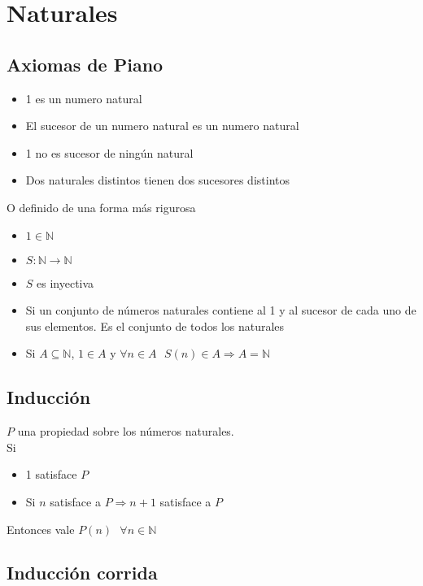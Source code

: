 \documentclass[a4paper,10pt]{article}
\begin{document}
\section{Naturales}


\subsection{Axiomas de Piano}


\begin{itemize}
	\item 1 es un numero natural 
	\item El sucesor de un numero natural es un numero natural
	\item 1 no es sucesor de ningún natural
	\item Dos naturales distintos tienen dos sucesores distintos
\end{itemize}

O definido de una forma más rigurosa \\

\begin{itemize}
	\item $1 \in \mathbb{N}$
	\item $S: \mathbb{N} \longrightarrow \mathbb{N}$
	\item $S$ es inyectiva
	\item Si un conjunto de números naturales contiene al 1 y al sucesor de cada uno de sus elementos. Es el conjunto de todos los naturales
	\item Si $A \subseteq \mathbb{N}$, $1 \in A$ y $\forall n \in A \mbox{ } S(n) \in A \Rightarrow A = \mathbb{N}$
\end{itemize} 


\subsection{Inducción}


$P$ una propiedad sobre los números naturales. \\ Si
\begin{itemize}
	\item 1 satisface $P$
	\item Si $n$ satisface a $P \Rightarrow n + 1$ satisface a $P$
\end{itemize} 
Entonces vale $P(n) \mbox{ } \forall n \in \mathbb{N}$

\subsection{Inducción corrida}
\end{document}
